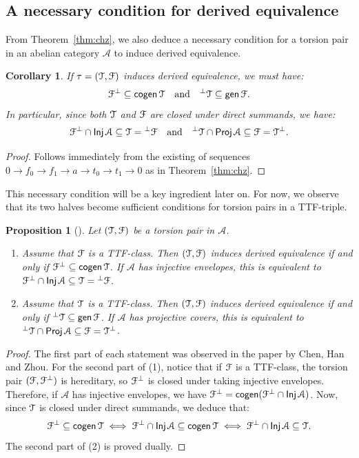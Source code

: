 \documentclass[a4paper,11pt]{amsart}
\theoremstyle{plain}
\newtheorem{prop}[thm]{Proposition}
\newtheorem{cor}[thm]{Corollary}
\theoremstyle{definition}
\newcommand{\Acal}{\mathcal{A}} \newcommand{\Bcal}{\mathcal{B}} \newcommand{\Ccal}{\mathcal{C}}
\DeclareMathOperator{\Proj}{\mathsf{Proj}}
\DeclareMathOperator{\Inj}{\mathsf{Inj}}
\DeclareMathOperator{\sub}{\mathsf{cogen}}
\DeclareMathOperator{\fac}{\mathsf{gen}}
\begin{document}
\subsection{A necessary condition for derived equivalence}

From Theorem~\ref{thm:chz}, we also deduce a necessary condition for a torsion
pair in an abelian category $\Acal$ to induce derived equivalence.

\begin{cor}\label{cor:necessary}
	If $\tau=(\mathcal{T},\mathcal{F})$ induces derived equivalence, we must have:
	\[\Fcal^\bot\subseteq
	\sub\Tcal\quad\text{and}\quad{}^\bot\Tcal\subseteq\fac\Fcal.\]
	In particular, since both $\mathcal{T}$ and $\mathcal{F}$ are closed under direct
	summands, we have:
	\[\Fcal^\bot\cap\Inj\Acal\subseteq
	\Tcal={}^\bot\Fcal\quad\text{and}\quad
	{}^\bot\Tcal\cap\Proj\Acal\subseteq\Fcal=\Tcal^\bot.\]
\end{cor}

\begin{proof}
	Follows immediately from the existing of sequences $0\to f_0\to f_1\to a\to
	t_0\to t_1\to 0$ as in Theorem~\ref{thm:chz}.
\end{proof}

This necessary condition will be a key ingredient later on. For now, we observe
that its two halves become sufficient conditions for torsion
pairs in a TTF-triple.

\begin{prop}[{\cite[Prop.~4.3]{chen-han-zhou-19}}]\label{prop:ttf}
	Let $(\mathcal{T},\mathcal{F})$ be a torsion pair in $\Acal$.
	\begin{enumerate}
		\item Assume that $\mathcal{F}$ is a TTF-class. Then $(\mathcal{T},\mathcal{F})$ induces
			derived equivalence if and only if $\Fcal^\bot\subseteq \sub\Tcal$. If
			$\Acal$ has injective envelopes, this is equivalent to
			$\Fcal^\bot\cap\Inj\Acal\subseteq\Tcal={}^\bot\Fcal$.
		\item Assume that $\mathcal{T}$ is a TTF-class. Then $(\mathcal{T},\mathcal{F})$ induces
			derived equivalence if and only if ${}^\bot\Tcal\subseteq \fac\Fcal$. If
			$\Acal$ has projective covers, this is equivalent to
			${}^\bot\Tcal\cap\Proj\Acal\subseteq\Fcal=\Tcal^\bot$.
	\end{enumerate}
\end{prop}

\begin{proof}
	The first part of each statement was observed in the paper by Chen, Han and
	Zhou. For the second part of (1), notice that if $\mathcal{F}$ is a TTF-class, 
	the torsion pair $(\mathcal{F},\mathcal{F}^\bot)$ is hereditary, so $\mathcal{F}^\bot$ is
	closed under taking injective envelopes. Therefore, if $\Acal$ has injective
	envelopes, we have $\Fcal^\bot=\sub(\Fcal^\bot\cap \Inj\Acal)$. Now, since
	$\mathcal{T}$ is closed under direct summands, we deduce that:
	\[ \Fcal^\bot\subseteq\sub\Tcal \iff \Fcal^\bot\cap\Inj\Acal\subseteq
	\sub\Tcal \iff \Fcal^\bot\cap\Inj\Acal\subseteq\Tcal.\]
	The second part of (2) is proved dually.
\end{proof}
\end{document}
